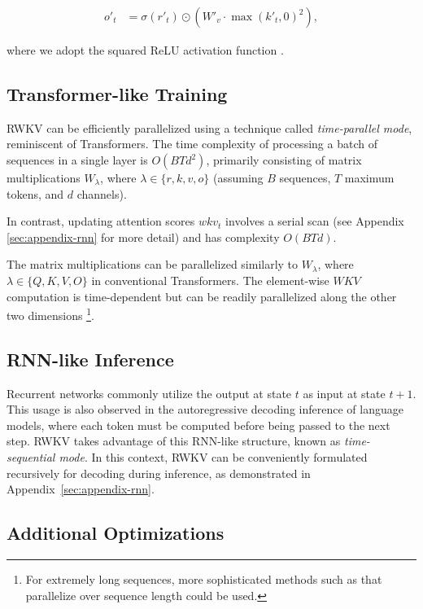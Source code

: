 \begin{align}
\label{eq:channel_mix_eqs3}
o'_t &= \sigma(r'_t) \odot (W'_v \cdot \max({k'_t}, 0)^2),
\end{align}

where we adopt the squared ReLU activation function \cite{DBLP:journals/corr/abs-2109-08668}.

\subsection{Transformer-like Training} \label{transformer_parallel}

RWKV can be efficiently parallelized using a technique called \textit{time-parallel mode}, reminiscent of Transformers. The time complexity of processing a batch of sequences in a single layer is $O(BTd^2)$, primarily consisting of matrix multiplications $W_\lambda$, where $\lambda\in \{r,k,v,o\}$ (assuming $B$ sequences, $T$ maximum tokens, and $d$ channels).

In contrast, updating attention scores $wkv_t$ involves a serial scan (see Appendix \ref{sec:appendix-rnn} for more detail) and has complexity $O(BTd)$.

The matrix multiplications can be parallelized similarly to $W_{\lambda}$, where $\lambda \in \{Q,K,V,O\}$ in conventional Transformers. The element-wise $WKV$ computation is time-dependent but can be readily parallelized along the other two dimensions \cite{lei-etal-2018-simple}\footnote{For extremely long sequences, more sophisticated methods such as \citet{Martin2017ParallelizingLR} that parallelize over sequence length could be used.}. 

\subsection{RNN-like Inference} \label{rnn_inference}

Recurrent networks commonly utilize the output at state $t$ as input at state $t+1$. This usage is also observed in the autoregressive decoding inference of language models, where each token must be computed before being passed to the next step. RWKV takes advantage of this RNN-like structure, known as \textit{time-sequential mode}. In this context, RWKV can be conveniently formulated recursively for decoding during inference, as demonstrated in Appendix~\ref{sec:appendix-rnn}.

\subsection{Additional Optimizations} \label{adding_opts}

